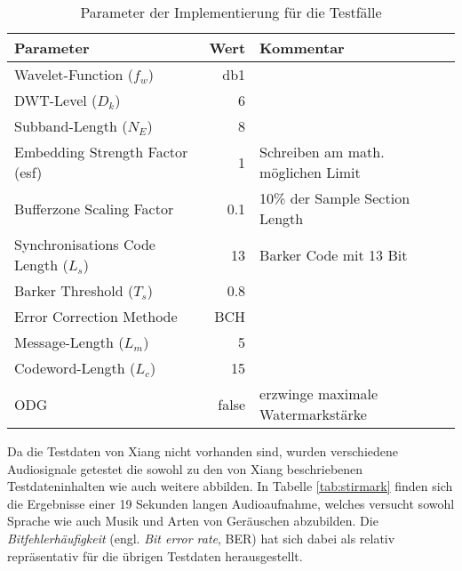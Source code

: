 \begin{table}[h]
\begin{tabular}{lrl}
\hline
\textbf{Parameter}                       & \textbf{Wert} & \textbf{Kommentar}                       \\ \hline
Wavelet-Function (${f}_{w}$)             & db1           &                                          \\
DWT-Level (${D}_{k}$)                    & 6             &                                          \\
Subband-Length (${N}_{E}$)               & 8             &                                          \\
Embedding Strength Factor (esf)          & 1             & Schreiben am math. möglichen Limit       \\
Bufferzone Scaling Factor                & 0.1           & 10\% der Sample Section Length           \\
Synchronisations Code Length (${L}_{s}$) & 13            & Barker Code mit 13 Bit                   \\
Barker Threshold (${T}_{s}$)             & 0.8           &                                          \\
Error Correction Methode                 & BCH           &                                          \\
Message-Length (${L}_{m}$)               & 5             &                                          \\
Codeword-Length (${L}_{c}$)              & 15            &                                          \\
ODG                             		 & false         & erzwinge maximale Watermarkstärke  		\\ \hline
                                                                   
\end{tabular}                             
\caption{Parameter der Implementierung für die Testfälle}
\label{tab:algo_settings}
\end{table}	

Da die Testdaten von Xiang nicht vorhanden sind, wurden verschiedene Audiosignale getestet die sowohl zu den von Xiang beschriebenen Testdateninhalten wie auch weitere abbilden. In Tabelle \ref{tab:stirmark} finden sich die Ergebnisse einer 19 Sekunden langen Audioaufnahme, welches versucht sowohl Sprache wie auch Musik und Arten von Geräuschen abzubilden. Die \textit{Bitfehlerhäufigkeit} (engl. \textit{Bit error rate},  BER) hat sich dabei als relativ repräsentativ für die übrigen Testdaten herausgestellt. 

